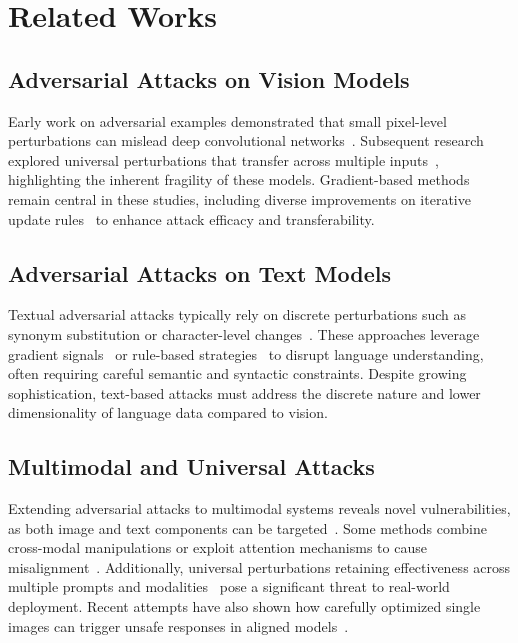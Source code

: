 \section{Related Works}

\subsection{Adversarial Attacks on Vision Models}
Early work on adversarial examples demonstrated that small pixel-level perturbations can mislead deep convolutional networks~\cite{szegedy2013intriguing,kurakin2016adversarial}. Subsequent research explored universal perturbations that transfer across multiple inputs~\cite{moosavi2017universal}, highlighting the inherent fragility of these models. Gradient-based methods remain central in these studies, including diverse improvements on iterative update rules~\cite{guo2021gradient} to enhance attack efficacy and transferability.

\subsection{Adversarial Attacks on Text Models}
Textual adversarial attacks typically rely on discrete perturbations such as synonym substitution or character-level changes~\cite{neekhara2018adversarial}. These approaches leverage gradient signals~\cite{guo2021gradient} or rule-based strategies~\cite{jones2023automatically} to disrupt language understanding, often requiring careful semantic and syntactic constraints. Despite growing sophistication, text-based attacks must address the discrete nature and lower dimensionality of language data compared to vision.

\subsection{Multimodal and Universal Attacks}
Extending adversarial attacks to multimodal systems reveals novel vulnerabilities, as both image and text components can be targeted~\cite{gu2024agent}. Some methods combine cross-modal manipulations or exploit attention mechanisms to cause misalignment~\cite{coattack,carlini2024aligned}. Additionally, universal perturbations retaining effectiveness across multiple prompts and modalities~\cite{zou2023universal} pose a significant threat to real-world deployment. Recent attempts have also shown how carefully optimized single images can trigger unsafe responses in aligned models~\cite{carlini2024aligned}.


